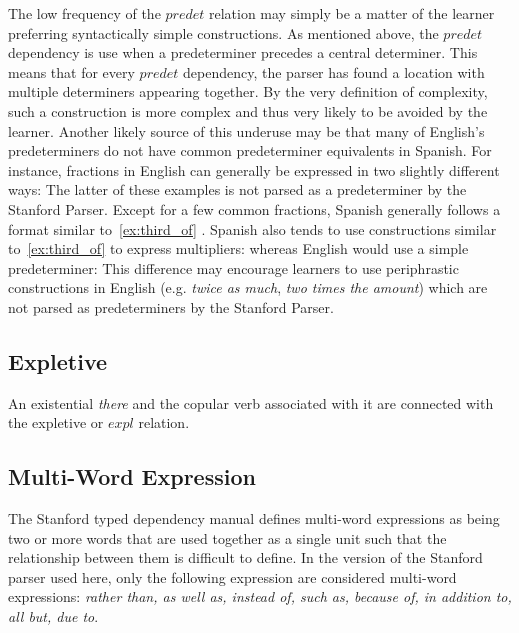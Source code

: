 \documentclass[main.tex]{subfiles}
\begin{document}
The low frequency of the $predet$ relation may simply be a matter of the learner preferring syntactically simple constructions. As mentioned above, the $predet$ dependency is use when a predeterminer precedes a central determiner. This means that for every $predet$ dependency, the parser has found a location with multiple determiners appearing together. By the very definition of complexity, such a construction is more complex and thus very likely to be avoided by the learner. Another likely source of this underuse may be that many of English's predeterminers do not have common predeterminer equivalents in Spanish. For instance, fractions in English can generally be expressed in two slightly different ways:
The latter of these examples is not parsed as a predeterminer by the Stanford Parser. Except for a few common fractions, Spanish generally follows a format similar to~\ref{ex:third_of} \citet[Ch. 10.10]{butt}. Spanish also tends to use constructions similar to~\ref{ex:third_of} to express multipliers:
whereas English would use a simple predeterminer:
This difference may encourage learners to use periphrastic constructions in English (e.g. \textit{twice as much}, \textit{two times the amount}) which are not parsed as predeterminers by the Stanford Parser.




\subsection{Expletive}

An existential \textit{there} and the copular verb associated with it are connected with the expletive or $expl$ relation.

\subsection{Multi-Word Expression}

The Stanford typed dependency manual \citep{typed-deps-manual} defines multi-word expressions as being two or more words that are used together as a single unit such that the relationship between them is difficult to define. In the version of the Stanford parser used here, only the following expression are considered multi-word expressions: \textit{rather than, as well as, instead of, such as, because of, in addition to, all but, due to}.
\end{document}
